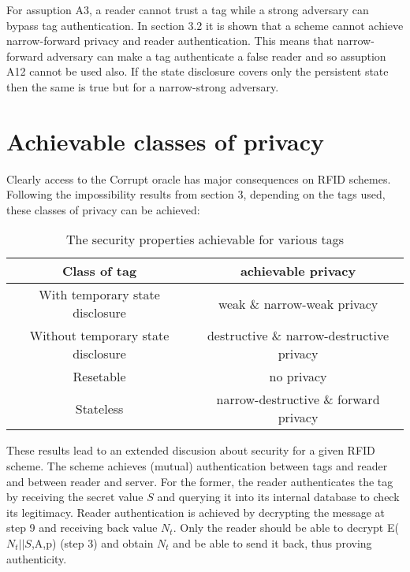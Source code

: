     For assuption A3, a reader cannot trust a tag while a strong adversary can bypass tag authentication. In section 3.2 it is shown 
    that a scheme cannot
    achieve narrow-forward privacy and reader authentication. This means that narrow-forward adversary can make a tag authenticate
    a false reader and so assuption A12 cannot be used also. If the state disclosure covers only the persistent state then the same is
    true but for a narrow-strong adversary.

\section{Achievable classes of privacy}

    Clearly access to the Corrupt oracle has major consequences on RFID schemes. Following the impossibility results from section 3, 
    depending on the tags used, these classes of privacy can be achieved:

    \begin{table}[H]
    \centering
    \caption{The security properties achievable for various tags}
    \begin{tabular}{| c | c |}
        \hline
        Class of tag & achievable privacy \\
        \hline
        With temporary state disclosure & weak \& narrow-weak privacy\\
        Without temporary state disclosure & destructive \& narrow-destructive privacy\\
        Resetable & no privacy \\
        Stateless & narrow-destructive \& forward privacy \\
        \hline
    \end{tabular}
    \end{table}

    These results lead to an extended discusion about security for a given RFID scheme. The \cite{BOM} scheme achieves (mutual)
    authentication between tags and reader and between reader and server. For the former, the reader authenticates the tag by
    receiving the secret value $S$ and querying it into its internal database to check its legitimacy. Reader authentication is
    achieved by decrypting the message at step 9 and receiving back value $N_t$. Only the reader should be able to decrypt 
    E($N_t||S$,A,p) (step 3) and obtain $N_t$ and be able to send it back, thus proving authenticity.
    

